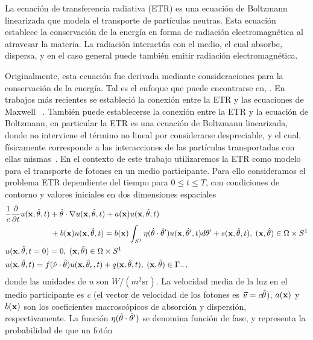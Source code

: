 La ecuación de transferencia radiativa (ETR) es una ecuación de Boltzmann 
linearizada que modela el transporte de partículas neutras. Esta ecuación establece 
la conservación de la energía en forma de  
radiación electromagnética al atravesar la materia. La radiación 
interactúa con el medio, el cual absorbe, dispersa, y en el caso 
general puede también emitir radiación electromagnética. 

Originalmente, esta ecuación fue derivada mediante 
consideraciones para la conservación de la energía. Tal es el enfoque 
que puede encontrarse en, \eg\cite{Chandrasekhar1960,Lewis1984}. En trabajos 
más recientes se estableció la conexión entre la ETR y las ecuaciones de Maxwell
~\cite{Mishchenko1999, Prasher2003}. También puede establecerse 
la conexión entre la ETR y la ecuación de Boltzmann, 
en particular la ETR es una ecuación de Boltzmann linearizada, 
donde no interviene el término no lineal por considerarse 
despreciable, y el cual, físicamente corresponde a las 
interacciones de las partículas transportadas con ellas mismas~\cite[Cap. 4]{Cercignani1988}. 
En el contexto de este trabajo utilizaremos la ETR como modelo para el transporte 
de fotones en un medio participante. Para ello consideramos el problema ETR dependiente 
del tiempo para $0\leq t\leq T$, con condiciones de contorno y valores iniciales 
en dos dimensiones espaciales 
\begin{equation}
\begin{split}
\begin{aligned}
&\frac{1}{c}\frac{\partial }{\partial t}u(\mathbf{x},\hat{\theta},t) + \hat{\theta} \cdot \nabla u(\mathbf{x},\hat{\theta},t)+a(\mathbf{x})u(\mathbf{x},\hat{\theta},t)  \\
&\quad \quad \quad  \quad \quad \; \;\,  +b(\mathbf{x})u(\mathbf{x},\hat{\theta},t) = b(\mathbf{x})\int_{S^1}\eta(\hat{\theta}\cdot\hat{\theta} ') 
u(\mathbf{x},\hat \theta',t) d\theta'+ s(\mathbf{x},\hat{\theta},t),\;  (\mathbf{x},\hat{\theta})  \in \Omega\times S^1\\
&u(\mathbf{x},\hat{\theta},t=0)=0, \;  (\mathbf{x},\hat{\theta})  \in \Omega\times S^1\\
&u(\mathbf{x},\hat{\theta},t)=f(\hat{\nu} \cdot \hat{\theta}) u(\mathbf{x},\hat{\theta}_r,t) + q(\mathbf{x},\hat{\theta},t) , \; (\mathbf{x},\hat{\theta}) \in \Gamma_-,
\end{aligned}
\end{split}
\label{eq:RTE}
\end{equation}
donde las unidades de $u$ son $ W / (m ^ 2  \mathrm{sr}) $.
La velocidad media de la luz en el medio participante es \textit{c} 
(el vector de velocidad de los fotones es $ \vec {v} = c \hat{\theta} $), $a(\mathbf{x})$ y $b(\mathbf{x})$ son los 
coeficientes macroscópicos de absorción y dispersión, respectivamente. La función $\eta(\hat{\theta}\cdot\hat{\theta} ')$
se denomina función de fase, y representa la probabilidad de que un fotón 
